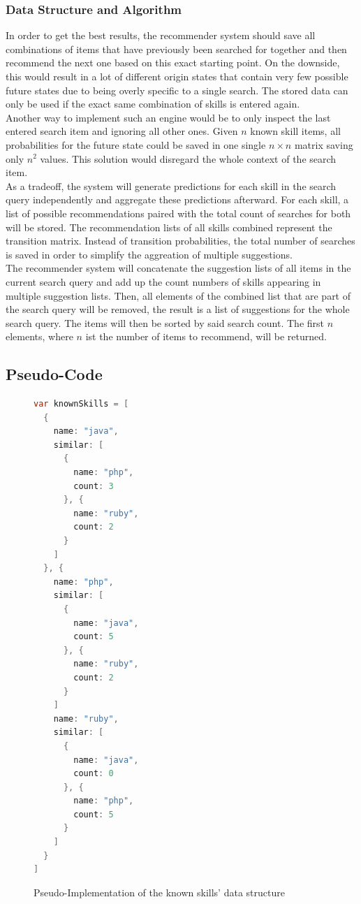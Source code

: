 \subsubsection{Data Structure and Algorithm}
In order to get the best results, the recommender system should save all combinations of items that have previously been searched for together and then recommend
the next one based on this exact starting point. On the downside, this would result in a lot of different origin states that contain very few possible future states due to being overly specific to a single search. The stored data can only be used if the exact same combination of skills is entered again.\\
Another way to implement such an engine would be to only inspect the last entered search item and ignoring all other ones. Given $n$ known skill items, all probabilities for the future state could be saved in one single $n \times n$ matrix saving only $n^2$ values.
This solution would disregard the whole context of the search item.\\
As a tradeoff, the system will generate predictions for each skill in the search query independently and aggregate these predictions afterward. For each skill, a list of possible recommendations paired with the total count of searches for both will be stored. The recommendation lists of all skills combined represent the transition matrix. Instead of transition probabilities, the total number of searches is saved in order to simplify the aggreation of multiple suggestions.\\
The recommender system will concatenate the suggestion lists of all items in the current search query and add up the count numbers of skills appearing in multiple suggestion lists. Then, all elements of the combined list that are part of the search query will be removed, the result is a list of suggestions for the whole search query. The items will then be sorted by said search count. The first $n$ elements, where $n$ ist the number of items to recommend, will be returned.\\

\newpage

\subsection{Pseudo-Code}
\begin{figure}[!htp]
\begin{lstlisting}[language=Java]
var knownSkills = [
  {
    name: "java",
    similar: [
      {
        name: "php",
        count: 3
      }, {
        name: "ruby",
        count: 2
      }
    ]
  }, {
    name: "php",
    similar: [
      {
        name: "java",
        count: 5
      }, {
        name: "ruby",
        count: 2
      }
    ]
    name: "ruby",
    similar: [
      {
        name: "java",
        count: 0
      }, {
        name: "php",
        count: 5
      }
    ]
  }
]
\end{lstlisting}
\caption[Data Structure: Known Skill]{Pseudo-Implementation of the known skills' data structure}
\end{figure}

